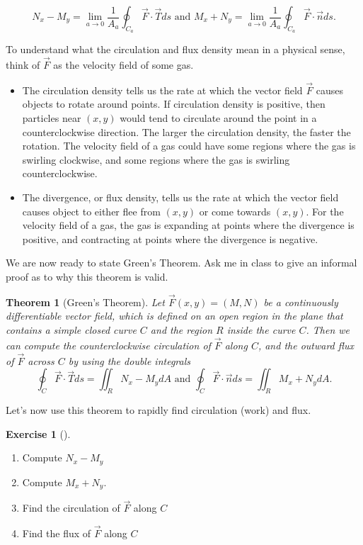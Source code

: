 \documentclass[10pt,]{book}
\theoremstyle{plain}
\newtheorem{theorem}{Theorem}[section]
\theoremstyle{definition}
\theoremstyle{definition}
\theoremstyle{definition}
\theoremstyle{definition}
\newtheorem{exploration}[project]{Exercise}
\theoremstyle{definition}
\numberwithin{equation}{section}
\begin{document}
\begin{equation*}
N_x-M_y=\lim_{a\to 0} \frac{1}{A_a}\oint_{C_a} \vec F \cdot \vec T ds  \text{ and }   M_x+N_y=\lim_{a\to 0} \frac{1}{A_a}\oint_{C_a} \vec F \cdot \vec n ds.
\end{equation*}
%
\par
To understand what the circulation and flux density mean in a physical sense, think of \(\vec F\) as the velocity field of some gas. \leavevmode%
\begin{itemize}[label=\textbullet]
\item{}The circulation density tells us the rate at which the vector field \(\vec F\) causes objects to rotate around points.  If circulation density is positive, then particles near \((x,y)\) would tend to circulate around the point in a counterclockwise direction. The larger the circulation density, the faster the rotation. The velocity field of a gas could have some regions where the gas is swirling clockwise, and some regions where the gas is swirling counterclockwise.%
\item{}The divergence, or flux density, tells us the rate at which the vector field causes object to either flee from \((x,y)\) or come towards \((x,y)\). For the velocity field of a gas, the gas is expanding at points where the divergence is positive, and contracting at points where the divergence is negative.%
\end{itemize}
%
\par
We are now ready to state Green's Theorem. Ask me in class to give an informal proof as to why this theorem is valid.%
\begin{theorem}[{Green's Theorem}]\label{theorem-12}
Let \(\vec F(x,y)=(M,N)\) be a continuously differentiable vector field, which is defined on an open region in the plane that contains a simple closed curve \(C\) and the region \(R\) inside the curve \(C\). Then we can compute the counterclockwise circulation of \(\vec F\) along \(C\), and the outward flux of \(\vec F\) across \(C\) by using the double integrals%
\begin{equation*}
\oint_{C} \vec F \cdot \vec T ds=\iint_R N_x-M_y dA 
\text{ and }   
\oint_{C} \vec F \cdot \vec n ds=\iint_R M_x+N_y dA.
\end{equation*}
%
\end{theorem}
Let's now use this theorem to rapidly find circulation (work) and flux.%
\begin{exploration}[]\label{exploration-272}
\leavevmode%
\begin{enumerate}[font=\bfseries,label=(\alph*),ref=\alph*]
\item\label{task-736} Compute \(N_x-M_y\)%
\item\label{task-737} Compute \(M_x+N_y\).%
\item\label{task-738} Find the circulation of \(\vec F\) along \(C\)%
\item\label{task-739} Find the flux of \(\vec F\) along \(C\)%
\end{enumerate}
\end{exploration}
\end{document}
